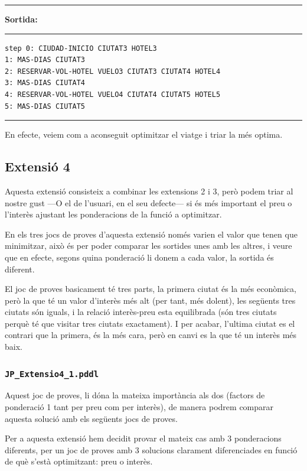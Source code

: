 \documentclass[11pt,a4paper]{article}
\begin{document}
\begin{samepage}
\medskip
\noindent
\rule{0.1\textwidth}{0.5mm}
\textbf{Sortida:}
\rule{0.76\textwidth}{0.5mm}
\begin{verbatim}
step 0: CIUDAD-INICIO CIUTAT3 HOTEL3
1: MAS-DIAS CIUTAT3
2: RESERVAR-VOL-HOTEL VUELO3 CIUTAT3 CIUTAT4 HOTEL4
3: MAS-DIAS CIUTAT4
4: RESERVAR-VOL-HOTEL VUELO4 CIUTAT4 CIUTAT5 HOTEL5
5: MAS-DIAS CIUTAT5
\end{verbatim}
\rule{\textwidth}{0.5mm}
\medskip
\end{samepage}

En efecte, veiem com a aconseguit optimitzar el viatge i triar la més optima.

\subsection{Extensió 4}

Aquesta extensió consisteix a combinar les extensions 2 i 3, però podem triar al nostre gust ---O el de l'usuari, en el seu defecte--- si és més important el preu o l'interès ajustant les ponderacions de la funció a optimitzar.

En els tres jocs de proves d'aquesta extensió només varien el valor que tenen que minimitzar, això és per poder comparar les sortides unes amb les altres, i veure que en efecte, segons quina ponderació li donem a cada valor, la sortida és diferent. 

El joc de proves basicament té tres parts, la primera ciutat és la més econòmica, però la que té un valor d'interès més alt (per tant, més dolent), les següents tres ciutats són iguals, i la relació interès-preu esta equilibrada (són tres ciutats perquè té que visitar tres ciutats exactament). I per acabar, l'ultima ciutat es el contrari que la primera, és la més cara, però en canvi es la que té un interès més baix.

\subsubsection*{\texttt{JP\_Extensio4\_1.pddl}}

Aquest joc de proves, li dóna la mateixa importància als dos (factors de ponderació 1 tant per preu com per interès), de manera podrem comparar aquesta solució amb els següents jocs de proves.

Per a aquesta extensió hem decidit provar el mateix cas amb 3 ponderacions diferents, per un joc de proves amb 3 solucions clarament diferenciades en funció de què s'està optimitzant: preu  o interès.
\end{document}

